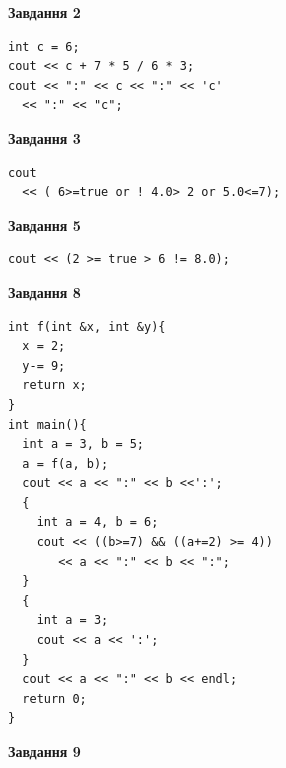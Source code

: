 \documentclass[12pt, ukrainian]{article}
\begin{document}
{\begin {large}
\begin{minipage}[t]{7.0cm}
\end{minipage}
\vline \hspace{1mm}
\begin{minipage}[t]{11.0cm}

\begin{center}
\textbf{Завдання 2}
\end{center}
\vspace{-8mm}

\begin{verbatim}
int c = 6;
cout << c + 7 * 5 / 6 * 3;
cout << ":" << c << ":" << 'c' 
  << ":" << "c";
\end{verbatim}



\begin{center}
\textbf{Завдання 3}
\end{center}
\vspace{-8mm}

\begin{verbatim}
cout 
  << ( 6>=true or ! 4.0> 2 or 5.0<=7);
\end{verbatim}



\begin{center}
\textbf{Завдання 5}
\end{center}
\vspace{-8mm}

\begin{verbatim}
cout << (2 >= true > 6 != 8.0);
\end{verbatim}



\begin{center}
\textbf{Завдання 8}
\end{center}
\vspace{-8mm}

\begin{verbatim}
int f(int &x, int &y){
  x = 2;
  y-= 9;
  return x;
}
int main(){
  int a = 3, b = 5;
  a = f(a, b);
  cout << a << ":" << b <<':';
  {
    int a = 4, b = 6;
    cout << ((b>=7) && ((a+=2) >= 4))
       << a << ":" << b << ":";
  }
  {
    int a = 3;
    cout << a << ':';
  }
  cout << a << ":" << b << endl;
  return 0;
}
\end{verbatim}

\end{minipage}


\begin{minipage}[t]{7.0cm}

\begin{center}
\textbf{Завдання 9}
\end{center}
\vspace{-8mm}


\end{minipage}
\end{large}}
\end{document}

